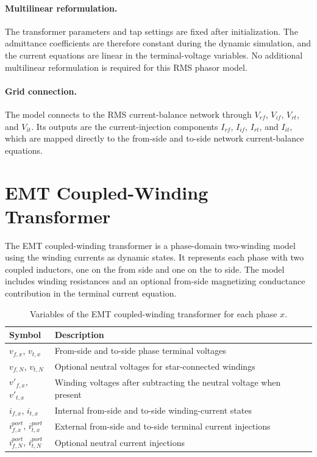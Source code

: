 \paragraph{Multilinear reformulation.}
The transformer parameters and tap settings are fixed after initialization. The admittance coefficients are therefore constant during the dynamic simulation, and the current equations are linear in the terminal-voltage variables. No additional multilinear reformulation is required for this RMS phasor model.

\paragraph{Grid connection.}
The model connects to the RMS current-balance network through $V_{rf}$, $V_{if}$, $V_{rt}$, and $V_{it}$. Its outputs are the current-injection components $I_{rf}$, $I_{if}$, $I_{rt}$, and $I_{it}$, which are mapped directly to the from-side and to-side network current-balance equations.

\section{EMT Coupled-Winding Transformer}

The EMT coupled-winding transformer is a phase-domain two-winding model using the winding currents as dynamic states. It represents each phase with two coupled inductors, one on the from side and one on the to side. The model includes winding resistances and an optional from-side magnetizing conductance contribution in the terminal current equation.

\begin{table}[H]
    \centering
    \caption{Variables of the EMT coupled-winding transformer for each phase $x$.}
    \begin{tabular}{ll}
        \toprule
        Symbol & Description \\
        \midrule
        $v_{f,x}$, $v_{t,x}$ & From-side and to-side phase terminal voltages \\
        $v_{f,N}$, $v_{t,N}$ & Optional neutral voltages for star-connected windings \\
        $v'_{f,x}$, $v'_{t,x}$ & Winding voltages after subtracting the neutral voltage when present \\
        $i_{f,x}$, $i_{t,x}$ & Internal from-side and to-side winding-current states \\
        $i^{port}_{f,x}$, $i^{port}_{t,x}$ & External from-side and to-side terminal current injections \\
        $i^{port}_{f,N}$, $i^{port}_{t,N}$ & Optional neutral current injections \\
        \bottomrule
    \end{tabular}
\end{table}

